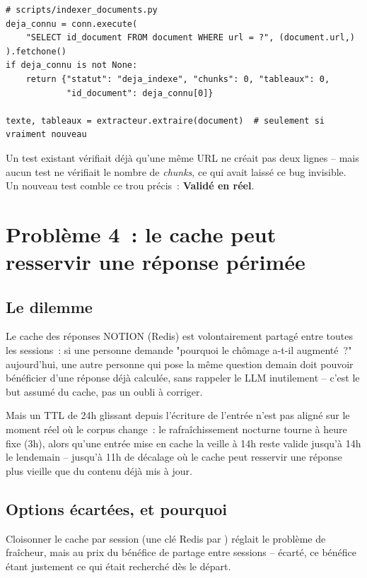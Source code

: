 \documentclass[11pt,a4paper]{article}
\newcommand{\code}[1]{\texttt{\detokenize{#1}}}
\newcommand{\ok}{\textcolor{okgreen}{\textbf{Valid\'e en r\'eel}}}
\begin{document}
\begin{lstlisting}
# scripts/indexer_documents.py
deja_connu = conn.execute(
    "SELECT id_document FROM document WHERE url = ?", (document.url,)
).fetchone()
if deja_connu is not None:
    return {"statut": "deja_indexe", "chunks": 0, "tableaux": 0,
            "id_document": deja_connu[0]}

texte, tableaux = extracteur.extraire(document)  # seulement si vraiment nouveau
\end{lstlisting}

Un test existant v\'erifiait d\'ej\`a qu'une m\^eme URL ne cr\'eait pas deux lignes
\code{document} -- mais aucun test ne v\'erifiait le nombre de \emph{chunks}, ce qui
avait laiss\'e ce bug invisible. Un nouveau test comble ce trou pr\'ecis~: \ok{}.

\section{Probl\`eme 4~: le cache peut resservir une r\'eponse p\'erim\'ee}

\subsection{Le dilemme}

Le cache des r\'eponses NOTION (Redis) est volontairement partag\'e entre toutes les
sessions~: si une personne demande "pourquoi le ch\^omage a-t-il augment\'e~?"
aujourd'hui, une autre personne qui pose la m\^eme question demain doit pouvoir
b\'en\'eficier d'une r\'eponse d\'ej\`a calcul\'ee, sans rappeler le LLM inutilement -- c'est
le but assum\'e du cache, pas un oubli \`a corriger.

Mais un TTL de 24h glissant depuis l'\'ecriture de l'entr\'ee n'est pas align\'e sur le
moment r\'eel o\`u le corpus change~: le rafra\^ichissement nocturne tourne \`a heure fixe
(3h), alors qu'une entr\'ee mise en cache la veille \`a 14h reste valide jusqu'\`a 14h le
lendemain -- jusqu'\`a 11h de d\'ecalage o\`u le cache peut resservir une r\'eponse plus
vieille que du contenu d\'ej\`a mis \`a jour.

\subsection{Options \'ecart\'ees, et pourquoi}

Cloisonner le cache par session (une cl\'e Redis par \code{id_session}) r\'eglait le
probl\`eme de fra\^icheur, mais au prix du b\'en\'efice de partage entre sessions --
\'ecart\'e, ce b\'en\'efice \'etant justement ce qui \'etait recherch\'e d\`es le d\'epart.
\end{document}

